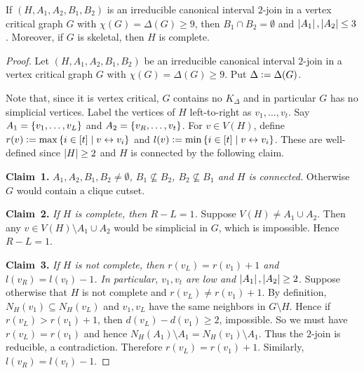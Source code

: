 \begin{lem}\label{Irreducible2Join}
If $(H, A_1, A_2, B_1, B_2)$ is an irreducible canonical interval $2$-join in a
vertex critical graph $G$ with $\chi(G) = \Delta(G) \geq 9$, then $B_1 \cap B_2
= \emptyset$ and $\left|A_1\right|, \left|A_2\right| \leq 3$.  Moreover, if $G$ is skeletal,
then $H$ is complete.
\end{lem}
\begin{proof}
Let $(H, A_1, A_2, B_1, B_2)$ be an irreducible canonical interval $2$-join in a
vertex critical graph $G$ with $\chi(G) = \Delta(G) \geq 9$.  Put $\Delta
\mathrel{\mathop:}= \Delta(G)$.

Note that, since it is vertex critical, $G$
contains no $K_\Delta$ and in particular $G$ has no simplicial vertices.  Label
the vertices of $H$ left-to-right as $v_1, \ldots, v_t$.  Say $A_1 = \left\{ v_1, \ldots, v_L \right\}$ and $A_2 = \left\{ v_R, \ldots, v_t \right\}$. For $v \in V(H)$, define $r(v) \mathrel{\mathop:}=
\max\left\{ i \in \left[t\right] \mid v \leftrightarrow v_i \right\}$ and $l(v) \mathrel{\mathop:}= \min\left\{ i \in \left[t\right] \mid v \leftrightarrow v_i \right\}$.  
These are well-defined since $\left|H\right| \geq 2$ and $H$ is connected by the following claim.

\textbf{Claim~1.} \textit{$A_1, A_2, B_1, B_2 \neq \emptyset$, $B_1 \not \subseteq
B_2$, $B_2 \not \subseteq B_1$ and $H$ is connected.} Otherwise $G$ would
contain a clique cutset.

\textbf{Claim~2.} \textit{If $H$ is complete, then $R - L = 1$.}  Suppose $V(H) \neq
A_1 \cup A_2$. Then any $v \in V(H) \setminus A_1 \cup A_2$ would be simplicial
in $G$, which is impossible.  Hence $R - L = 1$.

\textbf{Claim~3.} \textit{If $H$ is not complete, then $r(v_L) = r(v_1) + 1$ and
$l(v_R) = l(v_t) - 1$.  In particular, $v_1, v_t$ are low and $\left|A_1\right|,
\left|A_2\right| \geq 2$.} Suppose otherwise that $H$ is not
complete and $r(v_L) \neq r(v_1) + 1$. By definition, $N_H(v_1) \subseteq N_H(v_L)$ and $v_1, v_L$ have the same neighbors
in $G\setminus H$.  Hence if $r(v_L) > r(v_1) + 1$, then $d(v_L) - d(v_1) \geq
2$, impossible.  So we must have $r(v_L) = r(v_1)$ and hence $N_H(A_1)\setminus
A_1 = N_H(v_1)\setminus A_1$.  Thus the $2$-join is reducible, a contradiction.
Therefore $r(v_L) = r(v_1) + 1$.  Similarly, $l(v_R) = l(v_t) - 1$. 


\end{proof}
